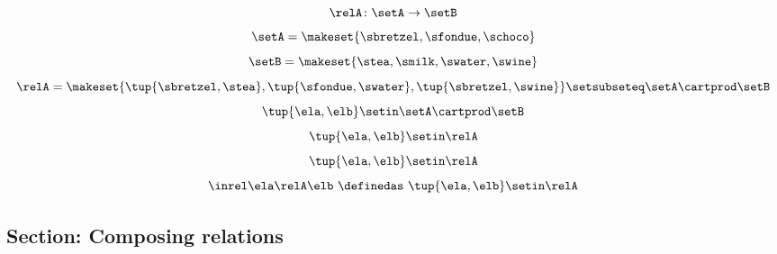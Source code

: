 \begin{forslides}

    \begin{equation}\label{eq:slides_session2_76}
        \relA \colon \setA \to \setB
    \end{equation}
    \begin{equation}\label{eq:slides_session2_77}
        \setA = \makeset{ \sbretzel, \sfondue, \schoco }
    \end{equation}
    \begin{equation}\label{eq:slides_session2_78}
        \setB = \makeset{ \stea, \smilk, \swater, \swine }
    \end{equation}
    \begin{equation}\label{eq:slides_session2_79}
        \relA = \makeset{ \tup{\sbretzel, \stea}, \tup{\sfondue, \swater}, \tup{\sbretzel, \swine} } \setsubseteq \setA \cartprod \setB
    \end{equation}
    \begin{equation}\label{eq:slides_session2_80}
        \tup{\ela,\elb} \setin \setA \cartprod \setB
    \end{equation}
    \begin{equation}\label{eq:slides_session2_81}
        \tup{\ela,\elb} \setin \relA
    \end{equation}
    \begin{equation}\label{eq:slides_session2_82}
        \tup{\ela,\elb}\setin \relA
    \end{equation}
    \begin{equation}\label{eq:slides_session2_83}
        \inrel \ela \relA \elb \ \definedas\  \tup{\ela,\elb}\setin \relA
    \end{equation}

    \subsection{Section: Composing relations}


\end{forslides}
